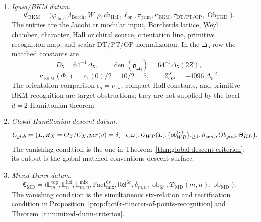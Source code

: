 \begin{defn}
\begin{enumerate}[label=(\roman*)]
      \(I_{\mathrm{ct}}\) is the counterterm scheme, and
      \(\mc O_{\mathrm{HAE}}\) is the holomorphic-anomaly/QME obstruction
      complex.
    \item \emph{Igusa/BKM datum.}
      \[
      \mathfrak C_{\mathrm{BKM}}=
      \bigl(\varphi_{\mathrm{Jac}},\Lambda_{\mathrm{Borch}},
      W,\rho,\mathrm{ch}_{\mathrm{Hall}},\ell_{\mathrm{or}},
      \pi_{\mathrm{prim}},\kappa_{\mathrm{BKM}},
      \tau_{\mathrm{DT/PT/OP}},
      \operatorname{Ob}_{\mathrm{UKD}}\bigr).
      \]
      The entries are the Jacobi or modular input, Borcherds lattice, Weyl
      chamber, character, Hall or chiral source, orientation line, primitive
      recognition map, and scalar DT/PT/OP normalization.
      In the \(\Delta_5\) row the matched constants are
      \[
        D_5=64^{-1}\Delta_5,\qquad
        \operatorname{den}(\mathfrak g_{\Delta_5})
          =64^{-1}\Delta_5(2Z),
      \]
      \[
        \kappa_{\mathrm{BKM}}(\Phi_1)=c_1(0)/2=10/2=5,\qquad
        Z^X_{\mathrm{OP}}=-4096\,\Delta_5^{-2}.
      \]
      The orientation comparison
      \(\epsilon_o=\nu_{\Delta_5}\), compact Hall constants, and
      primitive BKM recognition are target obstructions; they are not
      supplied by the local \(d=2\) Hamiltonian theorem.
    \item \emph{Global Hamiltonian descent datum.}
      \[
      C_{glob}=
      \bigl(L,H_X=O_X/C_X,
      per(v)=\delta(-\iota_v\omega),
      G_{WR}(L),
      \{ob^{(r)}_{WR}\}_{r\ge1},
      h_{cent},Ob_{glob},
      \Theta_{KD}\bigr).
      \]
      The vanishing condition is the one in
      Theorem~\ref{thm:global-descent-criterion}; its output is the
      global matched-conventions descent surface.
    \item \emph{Mixed-Dunn datum.}
      \[
      \mathfrak C_{\mathrm{MD}}=
      \bigl(\mathbb E_m^{\mathrm{top}},\mathbb E_n^{\mathrm{hol}},
      \mathbb E_{m,n}^{\mathrm{mix}},
      \mathrm{Fact}^{6r}_{\mathrm{mix}},
      \mathsf{Rel}^{6r},\delta_{m,n},
      \operatorname{ob}_{6r},
      \mathfrak D_{\mathrm{MD}}(m,n),
      \operatorname{ob}_{\mathrm{MD}}\bigr).
      \]
      The vanishing condition is the simultaneous six-relation and
      rectification condition in
      Proposition~\ref{prop:fact6r-functor-of-points-recognition} and
      Theorem~\ref{thm:mixed-dunn-criterion}.
  \end{enumerate}
\end{defn}

